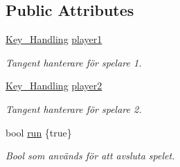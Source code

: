 \subsection*{Public Attributes}
\begin{DoxyCompactItemize}
\item 
\hyperlink{classKey__Handling}{Key\+\_\+\+Handling} \hyperlink{classWorld_a9607cd0034a5a2b9638598c64d03091e}{player1}
\begin{DoxyCompactList}\small\item\em Tangent hanterare för spelare 1. \end{DoxyCompactList}\item 
\hyperlink{classKey__Handling}{Key\+\_\+\+Handling} \hyperlink{classWorld_acbb895c03359b30548afdceeba0903e6}{player2}
\begin{DoxyCompactList}\small\item\em Tangent hanterare för spelare 2. \end{DoxyCompactList}\item 
bool \hyperlink{classWorld_a3bc8666629d71e77057927b14687407b}{run} \{true\}
\begin{DoxyCompactList}\small\item\em Bool som används för att avsluta spelet. \end{DoxyCompactList}\end{DoxyCompactItemize}
